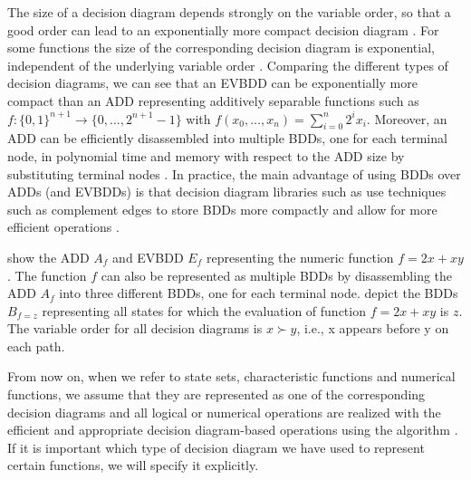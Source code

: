 The size of a decision diagram depends strongly on the variable order, so that a good order can lead to an exponentially more compact decision diagram \autocite{edelkamp-kissmann-aaai2011}. For some functions the size of the corresponding decision diagram is exponential, independent of the underlying variable order \autocite{bryant-ieeecomp1986,edelkamp-kissmann-aaai2011}. Comparing the different types of decision diagrams, we can see that an EVBDD can be exponentially more compact than an ADD \autocite{roux-siminiceanu-nfm2010} representing additively separable functions such as $f: \{ 0,1 \}^{n+1} \to \{0, \dots, 2^{n+1}-1\}$ with $f(x_0, \dots, x_n) = \sum_{i=0}^{n} 2^i x_i$. Moreover, an ADD can be efficiently disassembled into multiple BDDs, one for each terminal node, in polynomial time and memory with respect to the ADD size by substituting terminal nodes \autocite{torralba-phd2015}. In practice, the main advantage of using BDDs over ADDs (and EVBDDs) is that decision diagram libraries such as  \autocite{somenzi-cudd2015} use techniques such as complement edges to store BDDs more compactly \autocite{brace-et-al-acm1990} and allow for more efficient operations \autocite{burch-et-al-tcad1994}.

\begin{example}\label{ex:dds}
   show the ADD $A_f$ and EVBDD $E_f$ representing the numeric function $f = 2x + xy$. 
  The function $f$ can also be represented as multiple BDDs by disassembling the ADD $A_f$ into three different BDDs, one for each terminal node.  depict the BDDs $B_{f=z}$ representing all states for which the evaluation of function $f = 2x + xy$ is $z$. The variable order for all decision diagrams is $x \succ y$, i.e., x appears before y on each path.
\end{example}

From now on, 
when we refer to state sets, characteristic functions and numerical functions, we assume that they are represented as one of the corresponding decision diagrams and all logical or numerical operations are realized with the efficient and appropriate decision diagram-based operations using the  algorithm \autocite{bryant-ieeecomp1986,bahar-et-al-fmsd1997,lai-et-al-ieeetc1996}. If it is important which type of decision diagram we have used to represent certain functions, we will specify it explicitly.


